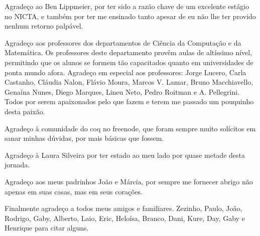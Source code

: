 \documentclass[bacharelado]{unb-cic}
\theoremstyle{definition}
\theoremstyle{definition}
\begin{document}
\begin{agradecimentos}
      Agradeço ao Ben Lippmeier, por ter sido a razão chave de um excelente estágio
      no NICTA, e também por ter me ensinado tanto apesar de eu não lhe ter provido nenhum retorno palpável. 

      Agradeço aos professores dos departamentos de Ciência da Computação e da Matemática.
      Os professores deste departamento provêm aulas de altíssimo nível,
      permitindo que os alunos se formem tão capacitados quanto em universidades
      de ponta mundo afora.
      Agradeço em especial aos professores: Jorge Lucero, Carla Castanho, Cláudia Nalon, 
      Flávio Moura, Marcos V. Lamar, Bruno Macchiavello, Genaína Nunes, 
      Diego Marques, Lineu Neto, 
      Pedro Roitman e A. Pellegrini. Todos por serem apaixonados pelo que fazem e terem
      me passado um pouquinho desta paixão.

      Agradeço à comunidade do coq no freenode, que foram sempre muito solícitos em
      sanar minhas dúvidas, por mais básicas que fossem.

      Agradeço à Laura Silveira por ter estado ao meu lado por quase metade desta jornada.

      Agradeço aos meus padrinhos João e Márcia, por sempre me fornecer abrigo não apenas em suas casas, mas em seus corações.

      Finalmente agradeço a todos meus amigos e familiares. Zezinho, Paulo, 
      João, Rodrigo, Gaby, Alberto, Laio, Eric, Heloísa, Branco, Dani, Kure, Day, 
      Gaby e Henrique para citar alguns.
  \end{agradecimentos}


  
  \tableofcontents
  \printglossary
  \listoffigures
  \listoftables

  \textual    
  
  
  
  
  
  


  \postextual
  
  
\end{document}
